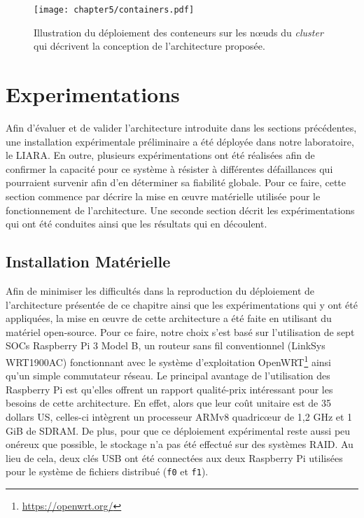 \begin{figure}[ht!]
	\centering
	\texttt{[image: chapter5/containers.pdf]}
        \caption{Illustration du déploiement des conteneurs sur les n\oe{}uds du \textit{cluster} qui décrivent la conception de l'architecture proposée.}
	\label{fig:containers}
\end{figure}

\section{Experimentations}

Afin d'évaluer et de valider l'architecture introduite dans les sections précédentes, une installation expérimentale préliminaire a été déployée dans notre laboratoire, le \acs{LIARA}. En outre, plusieurs expérimentations ont été réalisées afin de confirmer la capacité pour ce système à résister à différentes défaillances qui pourraient survenir afin d'en déterminer sa fiabilité globale. Pour ce faire, cette section commence par décrire la mise en \oe{}uvre matérielle utilisée pour le fonctionnement de l'architecture. Une seconde section décrit les expérimentations qui ont été conduites ainsi que les résultats qui en découlent.

\subsection{Installation Matérielle}

Afin de minimiser les difficultés dans la reproduction du déploiement de l'architecture présentée de ce chapitre ainsi que les expérimentations qui y ont été appliquées, la mise en \oe{}uvre de cette architecture a été faite en utilisant du matériel open-source. Pour ce faire, notre choix s'est basé sur l'utilisation de sept \acsp{SOC} Raspberry Pi 3 Model B, un routeur sans fil conventionnel (LinkSys WRT1900AC) fonctionnant avec le système d'exploitation OpenWRT\footnote{\url{https://openwrt.org/}} ainsi qu'un simple commutateur réseau. Le principal avantage de l'utilisation des Raspberry Pi est qu'elles offrent un rapport qualité-prix intéressant pour les besoins de cette architecture. En effet, alors que leur coût unitaire est de 35 dollars US, celles-ci intègrent un processeur ARMv8 quadric\oe{}ur de 1,2 GHz et 1 GiB de SDRAM. De plus, pour que ce déploiement expérimental reste aussi peu onéreux que possible, le stockage n'a pas été effectué sur des systèmes RAID. Au lieu de cela, deux clés USB ont été connectées aux deux Raspberry Pi utilisées pour le système de fichiers distribué (\texttt{f0} et \texttt{f1}).

